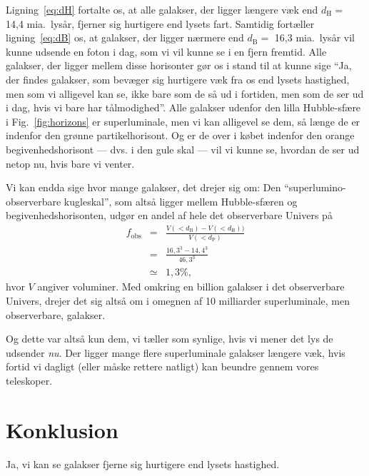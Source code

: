 \documentclass[useAMS,danish]{aa}
\begin{document}
Ligning~\ref{eq:dH} fortalte os, at alle galakser, der ligger længere væk end $d_\mathrm{H} =$ 14,4 mia.~lysår, fjerner sig hurtigere end lysets fart.
Samtidig fortæller ligning~\ref{eq:dB} os, at galakser, der ligger nærmere end $d_\mathrm{B} = $ 16,3 mia.~lysår vil kunne udsende en foton i dag, som vi vil kunne se i en fjern fremtid.
Alle galakser, der ligger mellem disse horisonter gør os i stand til at kunne sige ``Ja, der findes galakser, som bevæger sig hurtigere væk fra os end lysets hastighed, men som vi alligevel kan se, ikke bare som de så ud i fortiden, men som de ser ud i dag, hvis vi bare har tålmodighed''.
Alle galakser udenfor den lilla Hubble-sfære i Fig.~\ref{fig:horizons} er superluminale, men vi kan alligevel se dem, så længe de er indenfor den grønne partikelhorisont.
Og er de over i købet indenfor den orange begivenhedshorisont --- dvs. i den gule skal --- vil vi kunne se, hvordan de ser ud netop nu, hvis bare vi venter.

Vi kan endda sige hvor mange galakser, det drejer sig om:
Den ``superlumino-observerbare kugleskal'', som altså ligger mellem Hubble-sfæren og begivenhedshorisonten, udgør en andel af hele det observerbare Univers på
\begin{eqnarray}
    \label{eq:fobs}
    \nonumber
    f_\mathrm{obs} & = & \frac{V(<d_\mathrm{B}) - V(<d_\mathrm{H}))}
                              {V(<d_\mathrm{P})}\\
                   & = & \frac{16,\!3^3 - 14,\!4^3}{46,\!3^3}\\
                   & \simeq & 1,\!3\%,
\end{eqnarray}
hvor $V$ angiver voluminer.
Med omkring en billion galakser i det observerbare Univers, drejer det sig altså om i omegnen af 10 milliarder superluminale, men observerbare, galakser.

Og dette var altså kun dem, vi tæller som synlige, hvis vi mener det lys de udsender \emph{nu}.
Der ligger mange flere superluminale galakser længere væk, hvis fortid vi dagligt (eller måske rettere natligt) kan beundre gennem vores teleskoper.

\section{Konklusion}
\label{sec:konklusion}

Ja, vi kan se galakser fjerne sig hurtigere end lysets hastighed.
\end{document}
